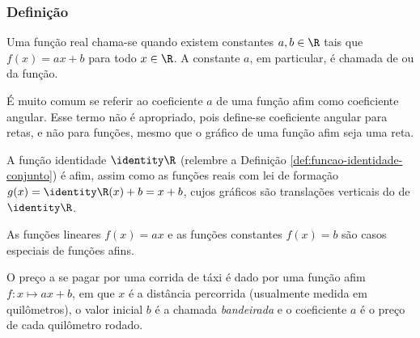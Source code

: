 \subsubsection{Definição}

\begin{definition}
Uma função real chama-se  quando existem constantes $a, b
\in \R$ tais que $f(x) = ax +b$ para todo $x\in \R$. 
A constante $a$, em particular, é chamada de  ou  da função.
\end{definition}

\begin{remark}
É muito comum se referir ao coeficiente $a$ de uma função afim como coeficiente angular.
Esse termo não é apropriado, pois define-se coeficiente angular para
retas, e não para funções, mesmo que o gráfico de uma
função afim seja uma reta.
\end{remark}

\begin{example}
A função identidade $\identity \R$ (relembre a Definição \ref{def:funcao-identidade-conjunto}) é afim, 
assim como as funções reais com lei de formação $g(x) = \identity \R (x)+b = x+b$, 
cujos gráficos são translações verticais do de $\identity \R$.
\end{example}

\begin{example}
As funções lineares $f(x) = ax$ e as funções constantes $f(x) = b$ são casos especiais de funções afins.
\end{example}

\begin{example}
O preço a se pagar por uma corrida de táxi é dado por uma função
afim $f: x \mapsto ax+b$, em que $x$ é a distância percorrida
(usualmente medida em quilômetros), o valor inicial $b$ é a chamada
\emph{bandeirada} e o coeficiente $a$ é o preço de cada quilômetro
rodado.
\end{example}